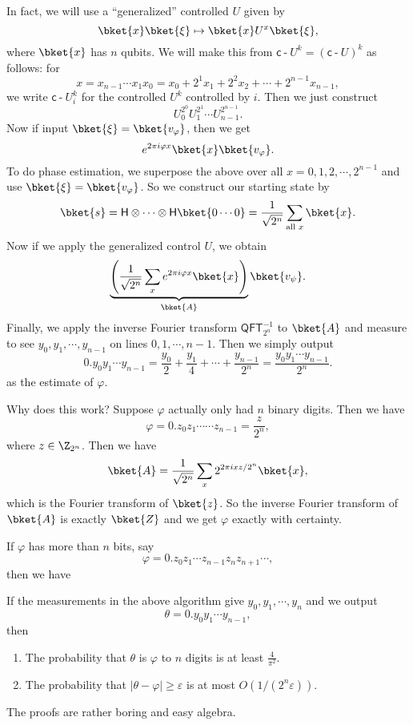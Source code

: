 \documentclass[a4paper]{article}
\newcommand{\qQFT}{\mathsf{QFT}}
\newcommand{\qH}{\mathsf{H}}
\newcommand{\qcd}{\mathsf{c}\operatorname{-}}
\begin{document}
In fact, we will use a ``generalized'' controlled $U$ given by
\[
  \bket{x} \bket{\xi} \mapsto \bket{x}U^x \bket{\xi},
\]
where $\bket{x}$ has $n$ qubits. We will make this from $\qcd U^k = (\qcd U)^k$ as follows: for
\[
  x = x_{n - 1} \cdots x_1 x_0 = x_0 + 2^1 x_1 + 2^2 x_2 + \cdots + 2^{n - 1}x_{n - 1},
\]
we write $\qcd U^k_i$ for the controlled $U^k$ controlled by $i$. Then we just construct
\[
  U^{2^0}_0 U^{2^1}_1 \cdots U^{2^{n - 1}}_{n - 1}.
\]
Now if input $\bket{\xi} = \bket{v_{\varphi}}$, then we get
\[
  e^{2\pi i \varphi x} \bket{x} \bket{v_\varphi}.
\]
To do phase estimation, we superpose the above over all $x = 0, 1, 2, \cdots, 2^{n - 1}$ and use $\bket{\xi} = \bket{v_\varphi}$. So we construct our starting state by
\[
  \bket{s} = \qH \otimes \cdots \otimes \qH \bket{0\cdots0} = \frac{1}{\sqrt{2^n}} \sum_{\text{all }x} \bket{x}.
\]
Now if we apply the generalized control $U$, we obtain
\[
  \underbrace{\left(\frac{1}{\sqrt{2^n}} \sum_x e^{2\pi i \varphi x}\bket{x}\right)}_{\bket{A}} \bket{v_\psi}.
\]
Finally, we apply the inverse Fourier transform $\qQFT_{2^n}^{-1}$ to $\bket{A}$ and measure to see $y_0, y_1, \cdots, y_{n -1 }$ on lines $0, 1, \cdots, n - 1$. Then we simply output
\[
  0.y_0 y_1 \cdots y_{n - 1} = \frac{y_0}{2} + \frac{y_1}{4} + \cdots + \frac{y_{n - 1}}{2^n} = \frac{y_0 y_1 \cdots y_{n - 1}}{2^n}.
\]
as the estimate of $\varphi$.

Why does this work? Suppose $\varphi$ actually only had $n$ binary digits. Then we have
\[
  \varphi = 0.z_0 z_1 \cdots \cdots z_{n - 1} = \frac{z}{2^n},
\]
where $z \in \Z_{2^n}$. Then we have
\[
  \bket{A} = \frac{1}{\sqrt{2^n}} \sum_x 2^{2\pi i x z/2^n} \bket{x},
\]
which is the Fourier transform of $\bket{z}$. So the inverse Fourier transform of $\bket{A}$ is exactly $\bket{Z}$ and we get $\varphi$ exactly with certainty.

If $\varphi$ has more than $n$ bits, say
\[
  \varphi = 0.z_0z_1 \cdots z_{n - 1}z_n z_{n + 1} \cdots,
\]
then we have
\begin{thm}
  If the measurements in the above algorithm give $y_0, y_1, \cdots, y_n$ and we output
  \[
    \theta = 0.y_0 y_1 \cdots y_{n - 1},
  \]
  then
  \begin{enumerate}
    \item The probability that $\theta$ is $\varphi$ to $n$ digits is at least $\frac{4}{\pi^2}$.
    \item The probability that $|\theta - \varphi| \geq \varepsilon$ is at most $O(1/(2^n \varepsilon))$.
  \end{enumerate}
\end{thm}
The proofs are rather boring and easy algebra.
\end{document}
